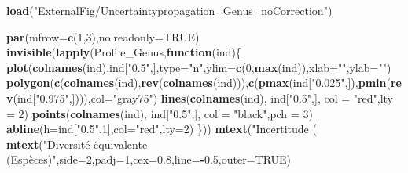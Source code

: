 \documentclass[
  11pt,
  french,
  A4paper,
  extrafontsizes,onecolumn,openright
  ]{memoir}
\newenvironment{Shaded}{\begin{snugshade}}{\end{snugshade}}
\newcommand{\KeywordTok}[1]{\textcolor[rgb]{0.13,0.29,0.53}{\textbf{#1}}}
\newcommand{\DataTypeTok}[1]{\textcolor[rgb]{0.13,0.29,0.53}{#1}}
\newcommand{\DecValTok}[1]{\textcolor[rgb]{0.00,0.00,0.81}{#1}}
\newcommand{\FloatTok}[1]{\textcolor[rgb]{0.00,0.00,0.81}{#1}}
\newcommand{\StringTok}[1]{\textcolor[rgb]{0.31,0.60,0.02}{#1}}
\newcommand{\OtherTok}[1]{\textcolor[rgb]{0.56,0.35,0.01}{#1}}
\newcommand{\ControlFlowTok}[1]{\textcolor[rgb]{0.13,0.29,0.53}{\textbf{#1}}}
\newcommand{\OperatorTok}[1]{\textcolor[rgb]{0.81,0.36,0.00}{\textbf{#1}}}
\newcommand{\NormalTok}[1]{#1}
\begin{document}
\begin{Shaded}
\begin{Highlighting}[]
\KeywordTok{load}\NormalTok{(}\StringTok{"ExternalFig/Uncertaintypropagation_Genus_noCorrection"}\NormalTok{)}

\KeywordTok{par}\NormalTok{(}\DataTypeTok{mfrow=}\KeywordTok{c}\NormalTok{(}\DecValTok{1}\NormalTok{,}\DecValTok{3}\NormalTok{),}\DataTypeTok{no.readonly=}\OtherTok{TRUE}\NormalTok{)}
\KeywordTok{invisible}\NormalTok{(}\KeywordTok{lapply}\NormalTok{(Profile_Genus,}\ControlFlowTok{function}\NormalTok{(ind)\{}
  \KeywordTok{plot}\NormalTok{(}\KeywordTok{colnames}\NormalTok{(ind),ind[}\StringTok{"0.5"}\NormalTok{,],}\DataTypeTok{type=}\StringTok{"n"}\NormalTok{,}\DataTypeTok{ylim=}\KeywordTok{c}\NormalTok{(}\DecValTok{0}\NormalTok{,}\KeywordTok{max}\NormalTok{(ind)),}\DataTypeTok{xlab=}\StringTok{""}\NormalTok{,}\DataTypeTok{ylab=}\StringTok{""}\NormalTok{)}
  \KeywordTok{polygon}\NormalTok{(}\KeywordTok{c}\NormalTok{(}\KeywordTok{colnames}\NormalTok{(ind),}\KeywordTok{rev}\NormalTok{(}\KeywordTok{colnames}\NormalTok{(ind))),}\KeywordTok{c}\NormalTok{(}\KeywordTok{pmax}\NormalTok{(ind[}\StringTok{"0.025"}\NormalTok{,]),}\KeywordTok{pmin}\NormalTok{(}\KeywordTok{rev}\NormalTok{(ind[}\StringTok{"0.975"}\NormalTok{,]))),}\DataTypeTok{col=}\StringTok{"gray75"}\NormalTok{)}
  \KeywordTok{lines}\NormalTok{(}\KeywordTok{colnames}\NormalTok{(ind), ind[}\StringTok{"0.5"}\NormalTok{,], }\DataTypeTok{col =} \StringTok{"red"}\NormalTok{,}\DataTypeTok{lty =} \DecValTok{2}\NormalTok{)}
  \KeywordTok{points}\NormalTok{(}\KeywordTok{colnames}\NormalTok{(ind), ind[}\StringTok{"0.5"}\NormalTok{,], }\DataTypeTok{col =} \StringTok{"black"}\NormalTok{,}\DataTypeTok{pch =} \DecValTok{3}\NormalTok{)}
  \KeywordTok{abline}\NormalTok{(}\DataTypeTok{h=}\NormalTok{ind[}\StringTok{"0.5"}\NormalTok{,}\DecValTok{1}\NormalTok{],}\DataTypeTok{col=}\StringTok{"red"}\NormalTok{,}\DataTypeTok{lty=}\DecValTok{2}\NormalTok{)}
\NormalTok{\}))}
\KeywordTok{mtext}\NormalTok{(}\StringTok{"Incertitude (%
\KeywordTok{mtext}\NormalTok{(}\StringTok{"Diversité équivalente (Espèces)"}\NormalTok{,}\DataTypeTok{side=}\DecValTok{2}\NormalTok{,}\DataTypeTok{padj=}\DecValTok{1}\NormalTok{,}\DataTypeTok{cex=}\FloatTok{0.8}\NormalTok{,}\DataTypeTok{line=}\OperatorTok{-}\FloatTok{0.5}\NormalTok{,}\DataTypeTok{outer=}\OtherTok{TRUE}\NormalTok{)}
}
\end{Highlighting}
\end{Shaded}
\end{document}
